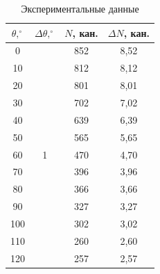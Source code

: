 \documentclass[a4paper, 12pt]{article}
\begin{document}
    \begin{table}[H]
        \centering
        \begin{tabular}{|c|c|c|c|}
        \hline
         $\theta, ^\circ$ & $\Delta \theta, ^\circ$ &  $N$, кан. & $\Delta N$, кан. \\ \hline
        0                     & \multirow{13}{*}{1} & 852                      & 8,52   \\ \cline{1-1} \cline{3-4} 
        10                    &                     & 812                      & 8,12   \\ \cline{1-1} \cline{3-4} 
        20                    &                     & 801                      & 8,01   \\ \cline{1-1} \cline{3-4} 
        30                    &                     & 702                      & 7,02   \\ \cline{1-1} \cline{3-4} 
        40                    &                     & 639                      & 6,39   \\ \cline{1-1} \cline{3-4} 
        50                    &                     & 565                      & 5,65   \\ \cline{1-1} \cline{3-4} 
        60                    &                     & 470                      & 4,70   \\ \cline{1-1} \cline{3-4} 
        70                    &                     & 396                      & 3,96   \\ \cline{1-1} \cline{3-4} 
        80                    &                     & 366                      & 3,66   \\ \cline{1-1} \cline{3-4} 
        90                    &                     & 327                      & 3,27   \\ \cline{1-1} \cline{3-4} 
        100                   &                     & 302                      & 3,02   \\ \cline{1-1} \cline{3-4} 
        110                   &                     & 260                      & 2,60   \\ \cline{1-1} \cline{3-4} 
        120                   &                     & 257                      & 2,57   \\ \hline
        \end{tabular}

        \caption{Экспериментальные данные}
        \label{table}
    \end{table}
\end{document}
